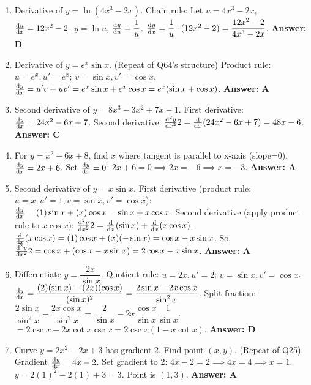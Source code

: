 \begin{enumerate}[label={\arabic*.}]
  \item Derivative of \(y = \ln(4x^3 - 2x)\).
    Chain rule: Let \(u = 4x^3 - 2x\), \(\frac{\mathrm{d}u}{\mathrm{d}x} = 12x^2 - 2\).
    \(y = \ln u\), \(\frac{\mathrm{d}y}{\mathrm{d}u} = \dfrac{1}{u}\).
    \(\frac{\mathrm{d}y}{\mathrm{d}x} = \dfrac{1}{u} \cdot (12x^2-2) = \dfrac{12x^2-2}{4x^3-2x}\).
    \textbf{Answer: D}

  \item Derivative of \(y = e^x \sin x\). (Repeat of Q64's structure)
    Product rule: \(u=e^x, u'=e^x\); \(v=\sin x, v'=\cos x\).
    \(\frac{\mathrm{d}y}{\mathrm{d}x} = u'v + uv' = e^x\sin x + e^x\cos x = e^x(\sin x + \cos x)\).
    \textbf{Answer: A}

  \item Second derivative of \(y = 8x^3 - 3x^2 + 7x - 1\).
    First derivative: \(\frac{\mathrm{d}y}{\mathrm{d}x} = 24x^2 - 6x + 7\).
    Second derivative: \(\frac{\mathrm{d}^2 y}{\mathrm{d} x^2}{2} = \frac{\mathrm{d}}{\mathrm{d}x}(24x^2 - 6x + 7) = 48x - 6\).
    \textbf{Answer: C}

  \item For \(y = x^2 + 6x + 8\), find \(x\) where tangent is parallel to x-axis (slope=0).
    \(\frac{\mathrm{d}y}{\mathrm{d}x} = 2x + 6\).
    Set \(\frac{\mathrm{d}y}{\mathrm{d}x}=0\): \(2x + 6 = 0 \implies 2x = -6 \implies x = -3\).
    \textbf{Answer: A}

  \item Second derivative of \(y = x\sin x\).
    First derivative (product rule: \(u=x, u'=1; v=\sin x, v'=\cos x\)):
    \(\frac{\mathrm{d}y}{\mathrm{d}x} = (1)\sin x + (x)\cos x = \sin x + x\cos x\).
    Second derivative (apply product rule to \(x\cos x\)):
    \(\frac{\mathrm{d}^2 y}{\mathrm{d} x^2}{2} = \frac{\mathrm{d}}{\mathrm{d}x}(\sin x) + \frac{\mathrm{d}}{\mathrm{d}x}(x\cos x)\).
    \(\frac{\mathrm{d}}{\mathrm{d}x}(x\cos x) = (1)\cos x + (x)(-\sin x) = \cos x - x\sin x\).
    So, \(\frac{\mathrm{d}^2 y}{\mathrm{d} x^2}{2} = \cos x + (\cos x - x\sin x) = 2\cos x - x\sin x\).
    \textbf{Answer: A}

  \item Differentiate \(y = \dfrac{2x}{\sin x}\).
    Quotient rule: \(u=2x, u'=2\); \(v=\sin x, v'=\cos x\).
    \(\frac{\mathrm{d}y}{\mathrm{d}x} = \dfrac{(2)(\sin x) - (2x)(\cos x)}{(\sin x)^2} = \dfrac{2\sin x - 2x\cos x}{\sin^2 x}\).
    Split fraction: \(\dfrac{2\sin x}{\sin^2 x} - \dfrac{2x\cos x}{\sin^2 x} = \dfrac{2}{\sin x} - 2x \dfrac{\cos x}{\sin x} \dfrac{1}{\sin x}\).
    \(= 2\csc x - 2x\cot x \csc x = 2\csc x(1 - x\cot x)\).
    \textbf{Answer: D}

  \item Curve \(y = 2x^2 - 2x + 3\) has gradient 2. Find point \((x,y)\). (Repeat of Q25)
    Gradient \(\frac{\mathrm{d}y}{\mathrm{d}x} = 4x - 2\).
    Set gradient to 2: \(4x - 2 = 2 \implies 4x = 4 \implies x = 1\).
    \(y = 2(1)^2 - 2(1) + 3 = 3\). Point is \((1,3)\).
    \textbf{Answer: A}


\end{enumerate}
